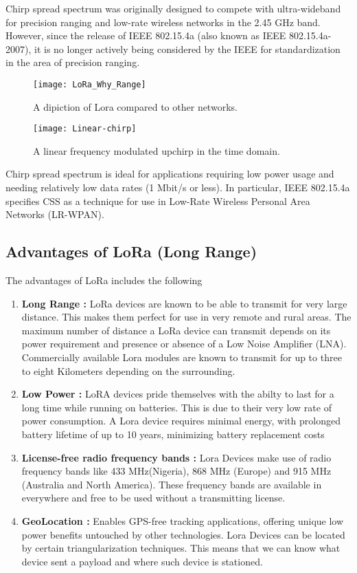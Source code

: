 Chirp spread spectrum was originally designed to compete with ultra-wideband for precision ranging and low-rate wireless networks in the 2.45 GHz band. However, since the release of IEEE 802.15.4a (also known as IEEE 802.15.4a-2007), it is no longer actively being considered by the IEEE for standardization in the area of precision ranging.

\begin{figure}[p]
\texttt{[image: LoRa\_Why\_Range]}
\centering
\caption{A dipiction of Lora compared to other networks.}
\centering
\label{fig:lo1}


\end{figure}

\begin{figure}[p]

\texttt{[image: Linear-chirp]}
\centering
\caption{A linear frequency modulated upchirp in the time domain.}
\centering
\label{fig:css}
\end{figure}

Chirp spread spectrum is ideal for applications requiring low power usage and needing relatively low data rates (1 Mbit/s or less). In particular, IEEE 802.15.4a specifies CSS as a technique for use in Low-Rate Wireless Personal Area Networks (LR-WPAN).




\subsection{Advantages of LoRa (Long Range)}
The advantages of LoRa includes the following
\begin{enumerate}
\item \textbf{Long Range :} LoRa devices are known to be able to transmit for very large distance. This makes them perfect for use in very remote and rural areas. The maximum number of distance a LoRa device can transmit depends on its power requirement and presence or absence of a Low Noise Amplifier (LNA). Commercially available Lora modules are known to transmit for up to three to eight Kilometers depending on the surrounding. 
\item \textbf{Low Power :} LoRA devices pride themselves with the abilty to last for a long time while running on batteries. This is due to their very low rate of power consumption. A Lora device requires minimal energy, with prolonged battery lifetime of up to 10 years, minimizing battery replacement costs
\item \textbf{License-free radio frequency bands :}  Lora Devices make use of radio frequency bands like 433 MHz(Nigeria), 868 MHz (Europe) and 915 MHz (Australia and North America). These frequency bands are available in everywhere and free to be used without a transmitting license. 
\item \textbf{GeoLocation :}  Enables GPS-free tracking applications, offering unique low power benefits untouched by other technologies. Lora Devices can be located by certain triangularization techniques. This means that we can know what device sent a payload and where such device is stationed. 
\end{enumerate}

